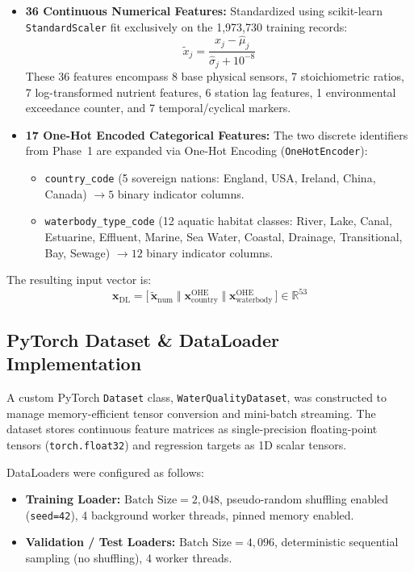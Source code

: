 \documentclass[conference]{IEEEtran}
\begin{document}
\begin{itemize}
  \item \textbf{36 Continuous Numerical Features:} Standardized using scikit-learn
        \texttt{StandardScaler} fit exclusively on the 1,973,730 training records:
        \begin{equation}
          \tilde{x}_j = \frac{x_j - \hat{\mu}_j}{\hat{\sigma}_j + 10^{-8}}
        \end{equation}
        These 36 features encompass 8 base physical sensors, 7 stoichiometric ratios,
        7 log-transformed nutrient features, 6 station lag features, 1 environmental
        exceedance counter, and 7 temporal/cyclical markers.
  \item \textbf{17 One-Hot Encoded Categorical Features:} The two discrete identifiers
        from Phase~1 are expanded via One-Hot Encoding (\texttt{OneHotEncoder}):
        \begin{itemize}
          \item \texttt{country\_code} (5 sovereign nations: England, USA, Ireland, China,
                Canada) $\rightarrow 5$ binary indicator columns.
          \item \texttt{waterbody\_type\_code} (12 aquatic habitat classes: River, Lake,
                Canal, Estuarine, Effluent, Marine, Sea Water, Coastal, Drainage,
                Transitional, Bay, Sewage) $\rightarrow 12$ binary indicator columns.
        \end{itemize}
\end{itemize}

The resulting input vector is:
\begin{equation}
  \mathbf{x}_{\text{DL}} = \big[\,\tilde{\mathbf{x}}_{\text{num}} \;\Vert\; \mathbf{x}_{\text{country}}^{\text{OHE}} \;\Vert\; \mathbf{x}_{\text{waterbody}}^{\text{OHE}}\,\big] \in \mathbb{R}^{53}
\end{equation}

\subsection{PyTorch Dataset \& DataLoader Implementation}
A custom PyTorch \texttt{Dataset} class, \texttt{WaterQualityDataset}, was constructed
to manage memory-efficient tensor conversion and mini-batch streaming. The dataset stores
continuous feature matrices as single-precision floating-point tensors (\texttt{torch.float32})
and regression targets as 1D scalar tensors.

DataLoaders were configured as follows:
\begin{itemize}
  \item \textbf{Training Loader:} $\text{Batch Size} = 2,048$, pseudo-random shuffling enabled
        (\texttt{seed=42}), 4 background worker threads, pinned memory enabled.
  \item \textbf{Validation / Test Loaders:} $\text{Batch Size} = 4,096$, deterministic sequential
        sampling (no shuffling), 4 worker threads.
\end{itemize}
\end{document}
